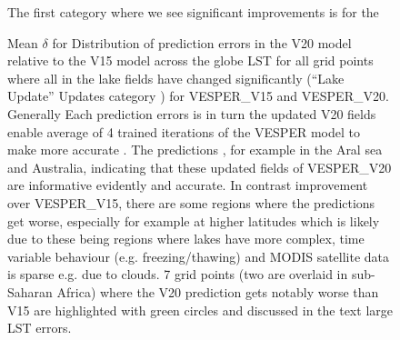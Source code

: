 \documentclass[hess, twostagejnl]{copernicus}
\providecommand{\DIFadd}[1]{{\protect\color{blue} \sf #1}} %
\providecommand{\DIFdel}[1]{{\protect\color{red} \scriptsize #1}} %
\providecommand{\DIFaddbegin}{} %
\providecommand{\DIFdelend}{} %
\providecommand{\DIFaddFL}[1]{\DIFadd{#1}} %
\providecommand{\DIFdelFL}[1]{\DIFdel{#1}} %
\providecommand{\DIFaddbeginFL}{} %
\providecommand{\DIFaddendFL}{} %
\providecommand{\DIFdelbeginFL}{} %
\providecommand{\DIFdelendFL}{} %
\begin{document}
\begin{figure}
	\DIFaddendFL \caption{\DIFdelbeginFL \DIFdelFL{Mean $\delta$ for }\DIFdelendFL \DIFaddbeginFL \DIFaddFL{Distribution of prediction errors in }\DIFaddendFL the \DIFdelbeginFL \DIFdelFL{V20 model relative to the V15 model across the globe }\DIFdelendFL \DIFaddbeginFL \DIFaddFL{LST }\DIFaddendFL for \DIFaddbeginFL \DIFaddFL{all }\DIFaddendFL grid points \DIFdelbeginFL \DIFdelFL{where all }\DIFdelendFL \DIFaddbeginFL \DIFaddFL{in }\DIFaddendFL the \DIFdelbeginFL \DIFdelFL{lake fields have changed significantly (``}\DIFdelendFL Lake \DIFdelbeginFL \DIFdelFL{Update'' }\DIFdelendFL \DIFaddbeginFL \DIFaddFL{Updates }\DIFaddendFL category \DIFdelbeginFL \DIFdelFL{)}\DIFdelendFL \DIFaddbeginFL \DIFaddFL{for VESPER\_V15 and VESPER\_V20}\DIFaddendFL .  \DIFdelbeginFL \DIFdelFL{Generally }\DIFdelendFL \DIFaddbeginFL \DIFaddFL{Each prediction errors is in turn }\DIFaddendFL the \DIFdelbeginFL \DIFdelFL{updated V20 fields enable }\DIFdelendFL \DIFaddbeginFL \DIFaddFL{average of 4 trained iterations of }\DIFaddendFL the \DIFaddbeginFL \DIFaddFL{VESPER }\DIFaddendFL model\DIFdelbeginFL \DIFdelFL{to make more accurate }\DIFdelendFL \DIFaddbeginFL \DIFaddFL{. The }\DIFaddendFL predictions \DIFdelbeginFL \DIFdelFL{, for example in the Aral sea and Australia, indicating that these updated fields }\DIFdelendFL \DIFaddbeginFL \DIFaddFL{of VESPER\_V20 }\DIFaddendFL are \DIFdelbeginFL \DIFdelFL{informative }\DIFdelendFL \DIFaddbeginFL \DIFaddFL{evidently }\DIFaddendFL and \DIFdelbeginFL \DIFdelFL{accurate. In contrast}\DIFdelendFL \DIFaddbeginFL \DIFaddFL{improvement over VESPER\_V15}\DIFaddendFL , \DIFdelbeginFL \DIFdelFL{there are some regions where the predictions get worse,  }\DIFdelendFL \DIFaddbeginFL \DIFaddFL{especially }\DIFaddendFL for \DIFdelbeginFL \DIFdelFL{example at higher latitudes which is likely due to these being regions where lakes have more complex, time variable behaviour (e.g. freezing/thawing) and MODIS satellite data is sparse e.g. due to clouds. 7 }\DIFdelendFL \DIFaddbeginFL \DIFaddFL{grid }\DIFaddendFL points \DIFdelbeginFL \DIFdelFL{(two are overlaid in sub-Saharan Africa) where the V20 prediction gets notably worse than V15 are highlighted }\DIFdelendFL with \DIFdelbeginFL \DIFdelFL{green circles and discussed in the text}\DIFdelendFL \DIFaddbeginFL \DIFaddFL{large LST errors}\DIFaddendFL .} 
	\DIFdelbeginFL %
\DIFdel{The first category where we see significant improvements is for the }\DIFdelend \DIFaddbegin \label{fig:example_figure_histogram}
\end{figure}
\end{document}
